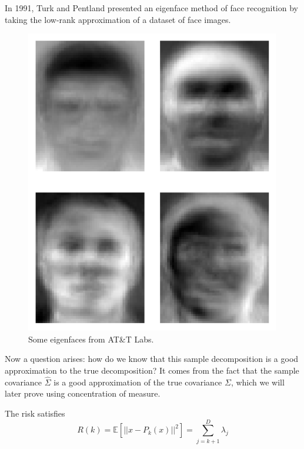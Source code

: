     \begin{example}[Eigenfaces]
      In 1991, Turk and Pentland presented an eigenface method of face recognition by taking the low-rank approximation of a dataset of face images. 

      \begin{figure}[H]
        \centering 
        \includegraphics[scale=0.3]{img/eigenfaces.png}
        \caption{Some eigenfaces from AT\&T Labs. } 
        \label{fig:eigenfaces}
      \end{figure}
    \end{example}

    Now a question arises: how do we know that this sample decomposition is a good approximation to the true decomposition? It comes from the fact that the sample covariance $\hat{\Sigma}$ is a good approximation of the true covariance $\Sigma$, which we will later prove using concentration of measure. 

    \begin{theorem}[Risk]
      The risk satisfies 
      \begin{equation}
        R(k) = \mathbb{E}[|| x - P_k (x) ||^2 ] = \sum_{j=k+1}^D \lambda_j 
      \end{equation}
    \end{theorem}

